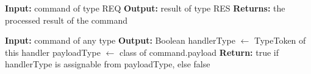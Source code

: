\begin{algorithm}[H]
\caption{CommandHandler (\emph{Interface})}
\begin{algorithmic}[1]
    \State \textbf{Input:} command of type \textlangle REQ\textrangle
    \State \textbf{Output:} result of type \textlangle RES\textrangle
    \State \textbf{Returns:} the processed result of the command
\EndProcedure

    \State \textbf{Input:} command of any type
    \State \textbf{Output:} Boolean
    \State handlerType $\gets$ TypeToken of this handler
    \State payloadType $\gets$ class of command.payload
    \State \textbf{Return:} true if handlerType is assignable from payloadType, else false
\EndProcedure
\end{algorithmic}
\end{algorithm}